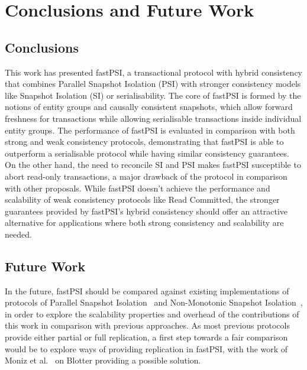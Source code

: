 \cleardoublepage
\chapter{Conclusions and Future Work}
\label{chapter:conclusion}

\section{Conclusions}

This work has presented fastPSI, a transactional protocol with hybrid consistency that combines Parallel Snapshot Isolation (PSI) with stronger consistency models like Snapshot Isolation (SI) or serialisability. The core of fastPSI is formed by the notions of entity groups and causally consistent snapshots, which allow forward freshness for transactions while allowing serialisable transactions inside individual entity groups. The performance of fastPSI is evaluated in comparison with both strong and weak consistency protocols, demonstrating that fastPSI is able to outperform a serialisable protocol while having similar consistency guarantees. On the other hand, the need to reconcile SI and PSI makes fastPSI susceptible to abort read-only transactions, a major drawback of the protocol in comparison with other proposals. While fastPSI doesn't achieve the performance and scalability of weak consistency protocols like Read Committed, the stronger guarantees provided by fastPSI's hybrid consistency should offer an attractive alternative for applications where both strong consistency and scalability are needed.

\section{Future Work}

In the future, fastPSI should be compared against existing implementations of protocols of Parallel Snapshot Isolation~\citep{psi-intro} and Non-Monotonic Snapshot Isolation~\citep{ardekani_nmsi, moniz_blotter}, in order to explore the scalability properties and overhead of the contributions of this work in comparison with previous approaches. As most previous protocols provide either partial or full replication, a first step towards a fair comparison would be to explore ways of providing replication in fastPSI, with the work of Moniz et al.~\citep{moniz_blotter} on Blotter providing a possible solution.

